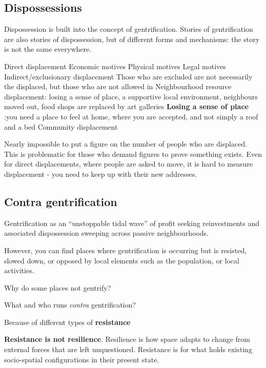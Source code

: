 \documentclass{article}
\begin{document}
\subsection{Dispossessions}

Dispossession is built into the concept of gentrification. Stories of gentrification are also stories of dispossession, but of different forms and mechanisms: the story is not the same everywhere.

\begin{outline}
	\1 Direct displacement
		\2 Economic motives
		\2 Physical motives
		\2 Legal motives
	\1 Indirect/exclusionary displacement
		\2 Those who are excluded are not necessarily the displaced, but those who are not allowed in
	\1 Neighbourhood resource displacement: losing a sense of place, a supportive local environment, neighbours moved out, food shops are replaced by art galleries
		\2 \textbf{Losing a sense of place} :you need a place to feel at home, where you are accepted, and not simply a roof and a bed
	\1 Community displacement
\end{outline}

Nearly impossible to put a figure on the number of people who are displaced. This is problematic for those who demand figures to prove something exists. Even for direct displacements, where people are asked to move, it is hard to measure displacement - you need to keep up with their new addresses. 

\subsection{Contra gentrification}

Gentrification as an ``unstoppable tidal wave'' of profit seeking reinvestments and associated dispossession sweeping across passive neighbourhoods.

However, you can find places where gentrification is occurring but is resisted, slowed down, or opposed by local elements such as the population, or local activities. 

Why do some places not gentrify?

What and who runs \textit{contra} gentrification?

Because of different types of \textbf{resistance}

\textbf{Resistance is not resilience}.
Resilience is how space adapts to change from external forces that are left unquestioned.
Resistance is for what holds existing socio-spatial configurations in their present state.
\end{document}

